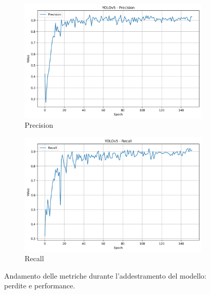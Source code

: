 \documentclass{article}
\begin{document}
\begin{figure}[h!]
  \begin{subfigure}[b]{0.495\textwidth}
    \centering
    \includegraphics[width=\linewidth]{img/Precision.png}
    \caption{Precision}
    \label{fig:precision}
  \end{subfigure}
  \begin{subfigure}[b]{0.495\textwidth}
    \centering
    \includegraphics[width=\linewidth]{img/Recall.png}
    \caption{Recall}
    \label{fig:recall}
  \end{subfigure}

  \caption{Andamento delle metriche durante l’addestramento del modello: perdite e performance.}
  \label{fig:training_metrics}
\end{figure}

\newpage
\end{document}
